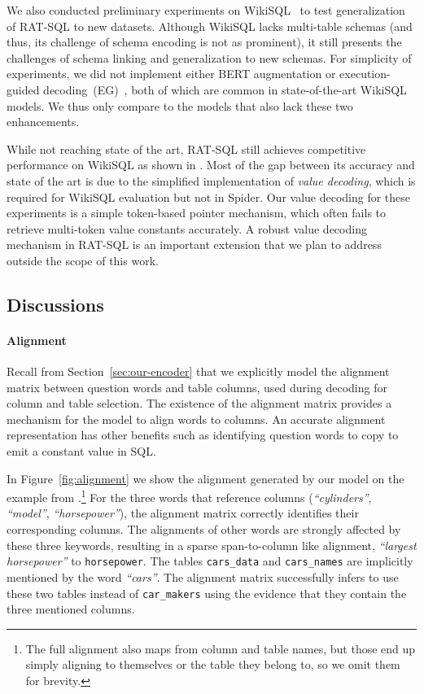 \documentclass[11pt,a4paper,final]{article}
\begin{document}
We also conducted preliminary experiments on WikiSQL~\citep{zhongSeq2SQLGeneratingStructured2017} to test
generalization of RAT-SQL to new datasets.
Although \mbox{WikiSQL} lacks multi-table schemas (and thus, its challenge of schema encoding is not as prominent), it still
presents the challenges of schema linking and generalization to new schemas.
For simplicity of experiments, we did not implement either BERT augmentation or execution-guided decoding~(EG)~\citep{wangRobustTexttoSQLGeneration2018},
both of which are common in state-of-the-art \mbox{WikiSQL} models.
We thus only compare to the models that also lack these two enhancements.

While not reaching state of the art, RAT-SQL still achieves competitive performance on WikiSQL as shown in
.
Most of the gap between its accuracy and state of the art is due to the simplified implementation of \emph{value
decoding}, which is required for WikiSQL evaluation but not in Spider.
Our value decoding for these experiments is a simple token-based pointer mechanism, which often fails to retrieve
multi-token value constants accurately.
A robust value decoding mechanism in RAT-SQL is an important extension that we plan to address outside
the scope of this work.

\subsection{Discussions}

\paragraph{Alignment}

Recall from Section~\ref{sec:our-encoder} that we explicitly model the alignment matrix between question words and table
columns, used during decoding for column and table selection.
The existence of the alignment matrix provides a mechanism for the model to align words to columns.
An accurate alignment representation has other benefits such as identifying question words to copy to emit a constant value in SQL.


In Figure~\ref{fig:alignment} we show the alignment generated by our model on the example from .\footnote{
The full alignment also maps from column and table names, but those end up simply aligning to themselves or the table
they belong to, so we omit them for brevity.}
For the three words that reference columns (\textit{``cylinders''}, \textit{``model''}, \textit{``horsepower''}), the alignment matrix
correctly identifies their corresponding columns.
The alignments of other words are strongly affected by these three keywords, resulting in a sparse span-to-column like alignment, \eg \textit{``largest horsepower''} to \texttt{horsepower}.
The tables \mbox{\texttt{cars\_data}} and \mbox{\texttt{cars\_names}}
are implicitly mentioned by the word \textit{``cars''}.
The alignment matrix successfully infers to use these two tables instead of \mbox{\texttt{car\_makers}} using the evidence that they contain the three mentioned columns.
\end{document}
